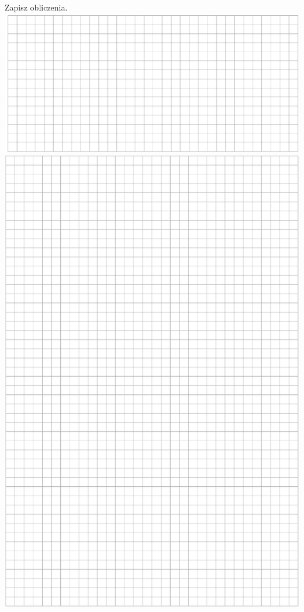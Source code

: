 \documentclass[10pt]{article}
\begin{document}
Zapisz obliczenia.\\
\includegraphics[max width=\textwidth, center]{2024_11_21_51cb67544fb9b029f01cg-08}\\
\includegraphics[max width=\textwidth, center]{2024_11_21_51cb67544fb9b029f01cg-09}
\end{document}
